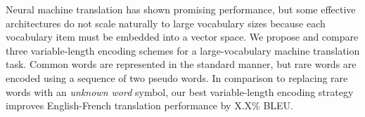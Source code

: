 Neural machine translation has shown promising performance, but some effective
architectures do not scale naturally to large vocabulary sizes because each
vocabulary item must be embedded into a vector space. We propose and compare
three variable-length encoding schemes for a large-vocabulary machine
translation task. Common words are represented in the standard manner, but rare
words are encoded using a sequence of two pseudo words. In comparison to
replacing rare words with an \emph{unknown word} symbol, our best
variable-length encoding strategy improves English-French translation
performance by X.X\% BLEU.
